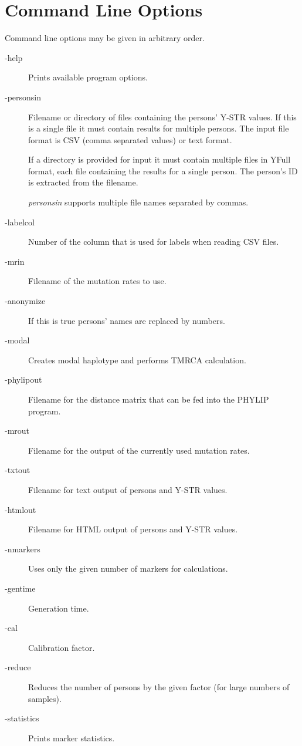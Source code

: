 \section{Command Line Options}

Command line options may be given in arbitrary order.

\begin{description}
\item[-help] Prints available program options.
\item[-personsin] Filename or directory of files containing the
	persons' Y-STR values. If this is a single file it must contain
	results for multiple persons. The input file format is CSV
    (comma separated values) or text format.

	If a directory is provided for input it must contain multiple
	files in YFull format, each file containing the results for
	a single person. The person's ID is extracted from the filename.

	\emph{personsin} supports multiple file names separated by
	commas.
\item[-labelcol] Number of the column that is used for labels
	when reading CSV files.
\item[-mrin] Filename of the mutation rates to use.
\item[-anonymize] If this is true persons' names are replaced by numbers.
\item[-modal] Creates modal haplotype and performs TMRCA calculation.
\item[-phylipout] Filename for the distance matrix that can be fed into
	the PHYLIP\cite{Phylip} program.
\item[-mrout] Filename for the output of the currently used mutation rates.
\item[-txtout] Filename for text output of persons and Y-STR values.
\item[-htmlout] Filename for HTML output of persons and Y-STR values.
\item[-nmarkers] Uses only the given number of markers for calculations.
\item[-gentime] Generation time.
\item[-cal] Calibration factor.
\item[-reduce] Reduces the number of persons by the given factor
	 (for large numbers of samples).
\item[-statistics] Prints marker statistics.
\end{description}

